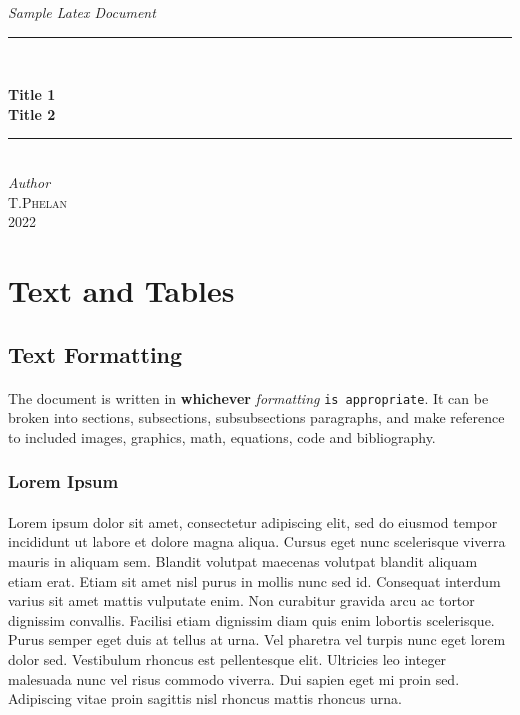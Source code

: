 \documentclass[a4paper,10pt]{article}
\begin{document}
\begin{titlepage}


\newcommand{\HRule}{\rule{\linewidth}{0.5mm}}
\center
\vspace*{4cm}
\textit{\Large Sample Latex Document}
\HRule\\[0.4cm]
{\huge\bfseries Title 1\vspace*{10mm} \\Title 2\\[0.4cm]
\HRule\\[1.5cm]
{\large\textit{Author}}\\
 \textsc{T.Phelan}\\
\vfill\vfill\vfill
{\large 2022}
\vfill}

\tableofcontents
\end{titlepage}

\section{Text and Tables}

\subsection{Text Formatting}
\paragraph{} The document is written in \textbf{whichever} \textit{formatting} \texttt{is appropriate}. It can be broken into sections, subsections, subsubsections paragraphs, and make reference to included images, graphics, math, equations, code and bibliography.

\subsubsection{Lorem Ipsum}
\paragraph{}Lorem ipsum dolor sit amet, consectetur adipiscing elit, sed do eiusmod tempor incididunt ut labore et dolore magna aliqua. Cursus eget nunc scelerisque viverra mauris in aliquam sem. Blandit volutpat maecenas volutpat blandit aliquam etiam erat. Etiam sit amet nisl purus in mollis nunc sed id. Consequat interdum varius sit amet mattis vulputate enim. Non curabitur gravida arcu ac tortor dignissim convallis. Facilisi etiam dignissim diam quis enim lobortis scelerisque. Purus semper eget duis at tellus at urna. Vel pharetra vel turpis nunc eget lorem dolor sed. Vestibulum rhoncus est pellentesque elit. Ultricies leo integer malesuada nunc vel risus commodo viverra. Dui sapien eget mi proin sed. Adipiscing vitae proin sagittis nisl rhoncus mattis rhoncus urna.
\end{document}
